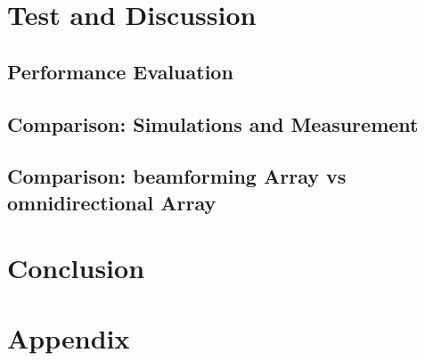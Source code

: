 \part{Test and Discussion}\label{pt:test}
\graphicspath{{figures/tests/}}
	\chapter{Performance Evaluation}
	\chapter{Comparison: Simulations and Measurement}
	\chapter{Comparison: beamforming Array vs omnidirectional Array}
		

 
\part{Conclusion}\label{pt:conclusion}
% 
%

\glsresetall
\appendix %

 \graphicspath{{figures/appendix/}}
\part{Appendix}\label{pt:appendix}














